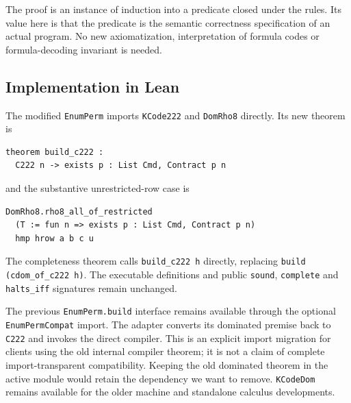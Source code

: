 \documentclass[11pt]{article}
\theoremstyle{definition}\newtheorem{definition}[theorem]{Definition}
\newcommand{\Comp}{\operatorname{Compilable}}
\newcommand{\code}[1]{\texttt{#1}}
\begin{document}
The proof is an instance of induction into a predicate closed under the rules.
Its value here is that the predicate is the semantic correctness specification
of an actual program. No new axiomatization, interpretation of formula codes or
formula-decoding invariant is needed.

\begin{center}
\end{center}

\subsection{Implementation in Lean}

The modified \code{EnumPerm} imports \code{KCode222} and \code{DomRho8}
directly. Its new theorem is
\begin{lstlisting}
theorem build_c222 :
  C222 n -> exists p : List Cmd, Contract p n
\end{lstlisting}
and the substantive unrestricted-row case is
\begin{lstlisting}
DomRho8.rho8_all_of_restricted
  (T := fun n => exists p : List Cmd, Contract p n)
  hmp hrow a b c u
\end{lstlisting}
The completeness theorem calls \code{build\_c222 h} directly, replacing
\code{build (cdom\_of\_c222 h)}. The executable definitions and public
\code{sound}, \code{complete} and \code{halts\_iff} signatures remain unchanged.

The previous \code{EnumPerm.build} interface remains available through the
optional \code{EnumPermCompat} import. The adapter converts its dominated
premise back to \code{C222} and invokes the direct compiler. This is an explicit
import migration for clients using the old internal compiler theorem; it is
not a claim of complete import-transparent compatibility. Keeping the old
dominated theorem in the active module would retain the dependency we want to
remove. \code{KCodeDom} remains available for the older machine and standalone
calculus developments.
\end{document}
